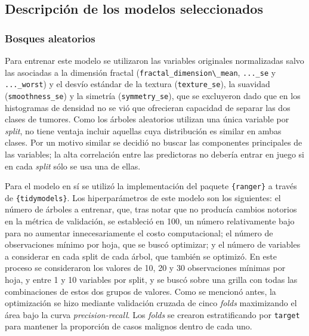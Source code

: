 \subsection{Descripción de los modelos seleccionados}\label{sec:detalle}


\subsubsection{Bosques aleatorios}

Para entrenar este modelo se utilizaron las variables originales normalizadas
salvo las asociadas a la dimensión fractal (\verb|fractal_dimension\_mean|,
\verb|..._se| y \verb|..._worst|) y el desvío estándar de la textura
(\verb|texture_se|), la suavidad (\verb|smoothness_se|) y la simetría
(\verb|symmetry_se|), que se excluyeron dado que en los histogramas de densidad
no se vió que ofrecieran capacidad de separar las dos clases de tumores. Como
los árboles aleatorios utilizan una única variable por \textit{split}, no tiene
ventaja incluir aquellas cuya distribución es similar en ambas clases. Por un
motivo similar se decidió no buscar las componentes principales de las
variables; la alta correlación entre las predictoras no debería entrar en juego
si en cada \textit{split} sólo se usa una de ellas.

Para el modelo en sí se utilizó la implementación del paquete \verb|{ranger}| a
través de \verb|{tidymodels}|. Los hiperparámetros de este modelo son los
siguientes: el número de árboles a entrenar, que, tras notar que no producía
cambios notorios en la métrica de validación, se estableció en 100, un número
relativamente bajo para no aumentar innecesariamente el costo computacional; el
número de observaciones mínimo por hoja, que se buscó optimizar; y el número de
variables a considerar en cada split de cada árbol, que también se optimizó. En
este proceso se consideraron los valores de 10, 20 y 30 observaciones mínimas
por hoja, y entre 1 y 10 variables por split, y se buscó sobre una grilla con
todas las combinaciones de estos dos grupos de valores. Como se mencionó antes,
la optimización se hizo mediante validación cruzada de cinco \textit{folds}
maximizando el área bajo la curva \textit{precision-recall}. Los \textit{folds}
se crearon estratificando por \verb|target| para mantener la proporción de
casos malignos dentro de cada uno.

